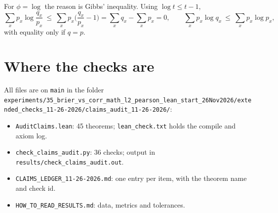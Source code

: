 \documentclass[11pt]{article}
\begin{document}
For $\phi=\log$ the reason is Gibbs' inequality. Using $\log t\le t-1$,
\[
\sum_x p_x\log\frac{q_x}{p_x}\ \le\ \sum_x p_x\Big(\frac{q_x}{p_x}-1\Big)=\sum_x q_x-\sum_x p_x=0,
\qquad
\boxed{\sum_x p_x\log q_x\ \le\ \sum_x p_x\log p_x},
\]
with equality only if $q=p$.

\section*{Where the checks are}

All files are on \texttt{main} in the folder \nolinkurl{experiments/35_brier_vs_corr_math_l2_pearson_lean_start_26Nov2026/extended_checks_11-26-2026/claims_audit_11-26-2026/}:
\begin{itemize}
\item \texttt{AuditClaims.lean}: 45 theorems; \texttt{lean\_check.txt} holds the compile and axiom log.
\item \texttt{check\_claims\_audit.py}: 36 checks; output in \texttt{results/check\_claims\_audit.out}.
\item \texttt{CLAIMS\_LEDGER\_11-26-2026.md}: one entry per item, with the theorem name and check id.
\item \texttt{HOW\_TO\_READ\_RESULTS.md}: data, metrics and tolerances.
\end{itemize}
\end{document}
